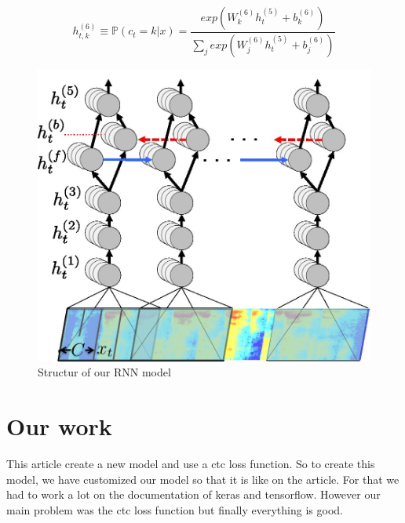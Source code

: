 \documentclass[12pt]{article}
\begin{document}
\[ h_{t,k}^{(6)} \equiv \mathbb{P}(c_t=k | x) = \frac{exp(W_k^{(6)}h_t^{(5)} + b_k^{(6)})}{\sum_j exp(W_j^{(6)}h_t^{(5)} + b_j^{(6)})} \]


\begin{figure}[H]
\begin{center}
\includegraphics[scale=0.20]{images/photo.jpg}
\caption{Structur of our RNN model}
\end{center}

\end{figure}

\section*{Our work}

This article \cite{article} create a new model and use a ctc loss function. So to create this model, we have customized our model so that it is like on the article. For that we had to work a lot on the documentation of keras and tensorflow. However our main problem was the ctc loss function but finally everything is good.





\end{document}

